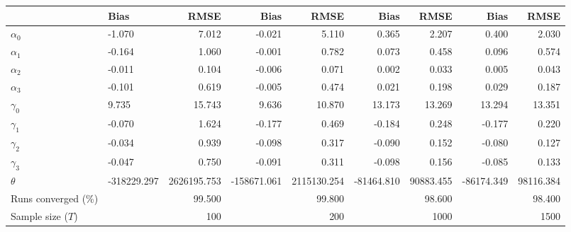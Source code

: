 
\begin{tabular}[t]{llrrrrrrr}
\toprule
  & Bias & RMSE & Bias & RMSE & Bias & RMSE & Bias & RMSE\\
\midrule
$\alpha_{0}$ & -1.070 & 7.012 & -0.021 & 5.110 & 0.365 & 2.207 & 0.400 & 2.030\\
$\alpha_{1}$ & -0.164 & 1.060 & -0.001 & 0.782 & 0.073 & 0.458 & 0.096 & 0.574\\
$\alpha_{2}$ & -0.011 & 0.104 & -0.006 & 0.071 & 0.002 & 0.033 & 0.005 & 0.043\\
$\alpha_{3}$ & -0.101 & 0.619 & -0.005 & 0.474 & 0.021 & 0.198 & 0.029 & 0.187\\
$\gamma_{0}$ & 9.735 & 15.743 & 9.636 & 10.870 & 13.173 & 13.269 & 13.294 & 13.351\\
$\gamma_{1}$ & -0.070 & 1.624 & -0.177 & 0.469 & -0.184 & 0.248 & -0.177 & 0.220\\
$\gamma_{2}$ & -0.034 & 0.939 & -0.098 & 0.317 & -0.090 & 0.152 & -0.080 & 0.127\\
$\gamma_{3}$ & -0.047 & 0.750 & -0.091 & 0.311 & -0.098 & 0.156 & -0.085 & 0.133\\
$\theta$ & -318229.297 & 2626195.753 & -158671.061 & 2115130.254 & -81464.810 & 90883.455 & -86174.349 & 98116.384\\
Runs converged (\%) &  & 99.500 &  & 99.800 &  & 98.600 &  & 98.400\\
Sample size ($T$) &  & 100 &  & 200 &  & 1000 &  & 1500\\
\bottomrule
\end{tabular}

